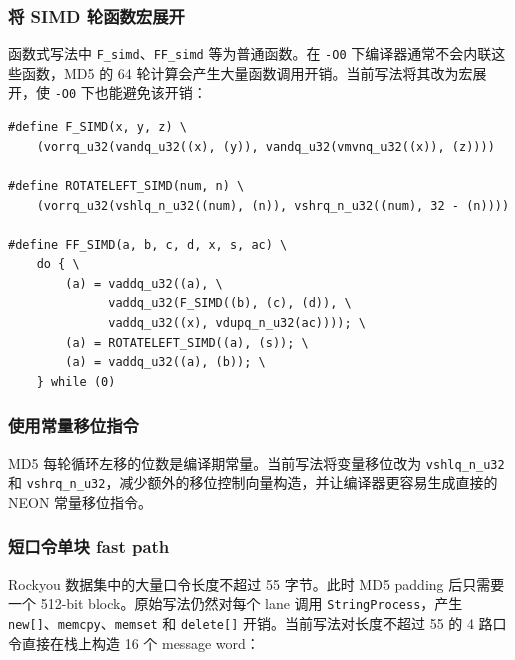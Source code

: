 \documentclass[UTF8,a4paper,12pt]{ctexart}
\begin{document}
\subsubsection{将 SIMD 轮函数宏展开}

函数式写法中 \texttt{F\_simd}、\texttt{FF\_simd} 等为普通函数。在 \texttt{-O0} 下编译器通常不会内联这些函数，MD5 的 64 轮计算会产生大量函数调用开销。当前写法将其改为宏展开，使 \texttt{-O0} 下也能避免该开销：

\begin{lstlisting}[style=cppstyle,caption={宏展开轮函数}]
#define F_SIMD(x, y, z) \
    (vorrq_u32(vandq_u32((x), (y)), vandq_u32(vmvnq_u32((x)), (z))))

#define ROTATELEFT_SIMD(num, n) \
    (vorrq_u32(vshlq_n_u32((num), (n)), vshrq_n_u32((num), 32 - (n))))

#define FF_SIMD(a, b, c, d, x, s, ac) \
    do { \
        (a) = vaddq_u32((a), \
              vaddq_u32(F_SIMD((b), (c), (d)), \
              vaddq_u32((x), vdupq_n_u32(ac)))); \
        (a) = ROTATELEFT_SIMD((a), (s)); \
        (a) = vaddq_u32((a), (b)); \
    } while (0)
\end{lstlisting}

\subsubsection{使用常量移位指令}

MD5 每轮循环左移的位数是编译期常量。当前写法将变量移位改为 \texttt{vshlq\_n\_u32} 和 \texttt{vshrq\_n\_u32}，减少额外的移位控制向量构造，并让编译器更容易生成直接的 NEON 常量移位指令。

\subsubsection{短口令单块 fast path}

Rockyou 数据集中的大量口令长度不超过 55 字节。此时 MD5 padding 后只需要一个 512-bit block。原始写法仍然对每个 lane 调用 \texttt{StringProcess}，产生 \texttt{new[]}、\texttt{memcpy}、\texttt{memset} 和 \texttt{delete[]} 开销。当前写法对长度不超过 55 的 4 路口令直接在栈上构造 16 个 message word：
\end{document}
